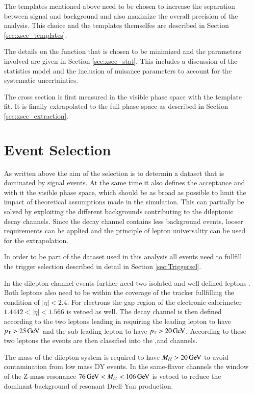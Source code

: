 The templates mentioned above need to be chosen to increase the separation between signal and background and also maximize the overall precision of the analysis.
This choice and the templates themselfes are described in Section \ref{sec:xsec_templates}.

The details on the function that is chosen to be minimized and the parameters involved are given in Section \ref{sec:xsec_stat}.
This includes a discussion of the statistics model and the inclusion of nuisance parameters to account for the systematic uncertainties.

The cross section is first measured in the visible phase space with the template fit. It is finally extrapolated to the full phase space as described in Section \ref{sec:xsec_extraction}.

\section{Event Selection}
\label{sec:xsec_sel}

As written above the aim of the selection is to determin a dataset that is dominated by signal events. At the same time it also defines the acceptance and with it the visible phase space, which should be as broad as possible to limit the impact of theoretical assumptions made in the simulation.
This can partially be solved by exploiting the different backgrounds contributing to the dileptonic \ttbar decay channels. 
Since the \emu decay channel contains less background events, looser requirements can be applied and the principle of lepton universality can be used for the extrapolation.

In order to be part of the dataset used in this analysis all events need to fullfill the trigger selection described in detail in Section \ref{sec:Triggersel}.

In the dilepton channel events further need two isolated and well defined leptons .
Both leptons also need to be within the coverage of the tracker fullfilling the condition of $|\eta| < 2.4$.
For electrons the gap region of the electronic calorimeter $1.4442<|\eta|<1.566$ is vetoed as well.
The decay channel is then defined according to the two leptons leading in \pt requiring the leading lepton to have $p_{\mathrm{T}} > 25 \,\text{Ge\hspace{-.08em}V}$
and the sub leading lepton to have $p_{\mathrm{T}} > 20 \,\text{Ge\hspace{-.08em}V}$. 
According to these two leptons the events are then classified into the \emu,\ee and \mumu channels.

The mass of the dilepton system is required to have $M_{\ell\ell} > 20 \,\text{Ge\hspace{-.08em}V}$ to avoid contamination from low mass DY events.
In the same-flavor channels the window of the Z-mass resonance $76 \,\text{Ge\hspace{-.08em}V} < M_{\ell\ell} <106 \,\text{Ge\hspace{-.08em}V}$ is vetoed to reduce the dominant background of 
resonant Drell-Yan production.

